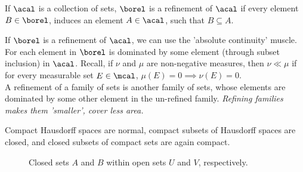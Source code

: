\documentclass[../main-v2-manifolds.tex]{subfiles}
\begin{document}
\begin{definition}[Refinement]\label{chp4:refinement-definition}
    If $\acal$ is a collection of sets, $\borel$ is a refinement of $\acal$ if every element $B\in\borel$, induces an element $A\in\acal$, such that $B\subseteq A$.
\end{definition}
\begin{remark}
    If $\borel$ is a refinement of $\acal$, we can use the 'absolute continuity' muscle. For each element in $\borel$ is dominated by some element (through subset inclusion) in $\acal$. Recall, if $\nu$ and $\mu$ are non-negative measures, then $\nu\ll\mu$ if for every measurable set $E\in\mcal$, $\mu(E)=0\implies \nu(E)=0$.\\
    
    A refinement of a family of sets is another family of sets, whose elements are dominated by some other element in the un-refined family. \emph{Refining families makes them 'smaller', cover less area.}
\end{remark}

\begin{wts}
    Compact Hausdorff spaces are normal, compact subsets of Hausdorff spaces are closed, and closed subsets of compact sets are again compact. 
\end{wts}




\begin{figure}[htbp]
        \centering
        \caption{Closed sets $A$ and $B$ within open sets $U$ and $V$, respectively.}
        \label{lee-appendix-A.45-graphic}
\end{figure}
\end{document}
